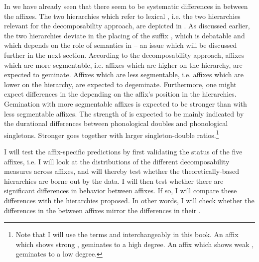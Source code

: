  In  we have already seen that there seem to be systematic differences in  between the affixes. 
The two  hierarchies which refer to lexical , i.e. the two hierarchies relevant for the decomposability approach, are depicted in . As discussed earlier, the two hierarchies deviate in the placing of the suffix , which is debatable and which depends on the role of semantics in  --  an issue which will be discussed further in the next section.
According to the decomposability approach, affixes which are more segmentable, i.e. affixes which are higher on the  hierarchy, are expected to geminate. Affixes which are less segmentable, i.e. affixes which are lower on the hierarchy, are expected to degeminate. Furthermore, one might expect differences in the  depending on the affix's position in the hierarchies. Gemination with more segmentable affixes is expected to be stronger than  with less segmentable affixes. The strength of  is expected to be mainly indicated by the durational differences between phonological doubles and phonological singletons. Stronger  goes together with larger singleton-double ratios.\footnote{Note that I will use the terms  and  interchangeably in this book. An affix which shows strong , geminates to a high degree. An affix which shows weak , geminates to a low degree.}




I will test the affix-specific  predictions by first validating the  status of the five affixes, i.e. I will look at the distributions of the different decomposability measures across affixes, and will thereby test whether the theoretically-based hierarchies are borne out by the data. I will then test whether there are significant differences in  behavior between affixes. If so, I will compare these differences with the  hierarchies proposed. In other words, I will check whether  the differences in the  between affixes mirror the differences in their .\largerpage[-1]

